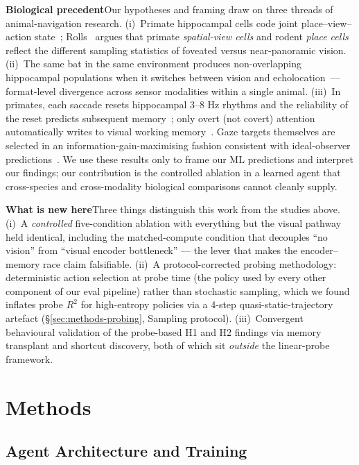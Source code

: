 \documentclass{article}
\begin{document}
\noindent\textbf{Biological precedent}\quad Our hypotheses and framing draw on three threads of animal-navigation research. (i)~Primate hippocampal cells code joint place--view--action state~\citep{wirth2017gaze,rolls2023viewcells}; Rolls~\citep{rolls2024why} argues that primate \emph{spatial-view cells} and rodent \emph{place cells} reflect the different sampling statistics of foveated versus near-panoramic vision. (ii)~The same bat in the same environment produces non-overlapping hippocampal populations when it switches between vision and echolocation~\citep{geva2016remapping}---format-level divergence across sensor modalities within a single animal. (iii)~In primates, each saccade resets hippocampal 3--8 Hz rhythms and the reliability of the reset predicts subsequent memory~\citep{jutras2013saccades}; only overt (not covert) attention automatically writes to visual working memory~\citep{tas2016overt}. Gaze targets themselves are selected in an information-gain-maximising fashion consistent with ideal-observer predictions~\citep{najemnik2005optimal,gottlieb2013information,hayhoe2018control}. We use these results only to frame our ML predictions and interpret our findings; our contribution is the controlled ablation in a learned agent that cross-species and cross-modality biological comparisons cannot cleanly supply.

\noindent\textbf{What is new here}\quad Three things distinguish this work from the studies above. (i)~A \emph{controlled} five-condition ablation with everything but the visual pathway held identical, including the matched-compute condition that decouples ``no vision'' from ``visual encoder bottleneck'' --- the lever that makes the encoder--memory race claim falsifiable. (ii)~A protocol-corrected probing methodology: deterministic action selection at probe time (the policy used by every other component of our eval pipeline) rather than stochastic sampling, which we found inflates probe $R^2$ for high-entropy policies via a 4-step quasi-static-trajectory artefact (§\ref{sec:methods-probing}, Sampling protocol). (iii)~Convergent behavioural validation of the probe-based H1 and H2 findings via memory transplant and shortcut discovery, both of which sit \emph{outside} the linear-probe framework.


\section{Methods}

\subsection{Agent Architecture and Training}
\end{document}
